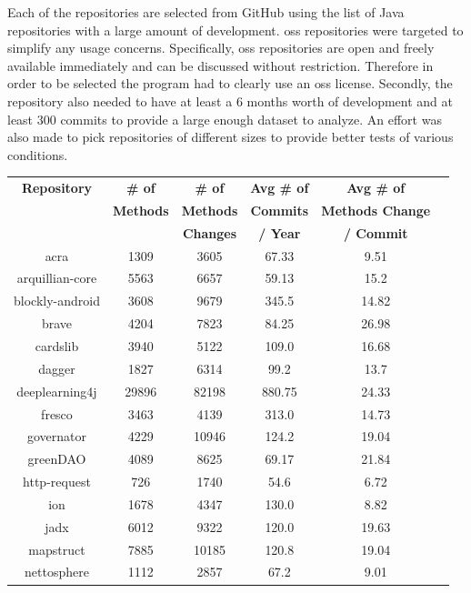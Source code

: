 Each of the repositories are selected from GitHub using the list of Java repositories with a large amount of development. \gls{oss} repositories were targeted to simplify any usage concerns. Specifically, \gls{oss} repositories are open and freely available immediately and can be discussed without restriction. Therefore in order to be selected the program had to clearly use an \gls{oss} license. Secondly, the repository also needed to have at least a 6 months worth of development and at least 300 commits to provide a large enough dataset to analyze. An effort was also made to pick repositories of different sizes to provide better tests of various conditions.

\begin{table}
\begin{center}
    \begin{tabular}{|c|c|c|c|c|c|}
        \hline
        \textbf{Repository} & \textbf{\# of} & \textbf{\# of} & \textbf{Avg \# of} & \textbf{Avg \# of} \\
         & \textbf{Methods} & \textbf{Methods} & \textbf{Commits} & \textbf{Methods Change} \\
         & & \textbf{Changes} & \textbf{/ Year} & \textbf{/ Commit} \\
        \hline
        acra & 1309 & 3605 & 67.33 & 9.51 \\
        arquillian-core & 5563 & 6657 & 59.13 & 15.2 \\
        blockly-android & 3608 & 9679 & 345.5 & 14.82 \\
        brave & 4204 & 7823 & 84.25 & 26.98 \\
        cardslib & 3940 & 5122 & 109.0 & 16.68 \\
        dagger & 1827 & 6314 & 99.2 & 13.7 \\
        deeplearning4j & 29896 & 82198 & 880.75 & 24.33 \\
        fresco & 3463 & 4139 & 313.0 & 14.73 \\
        governator & 4229 & 10946 & 124.2 & 19.04 \\
        greenDAO & 4089 & 8625 & 69.17 & 21.84 \\
        http-request & 726 & 1740 & 54.6 & 6.72 \\
        ion & 1678 & 4347 & 130.0 & 8.82 \\
        jadx & 6012 & 9322 & 120.0 & 19.63 \\
        mapstruct & 7885 & 10185 & 120.8 & 19.04 \\
        nettosphere & 1112 & 2857 & 67.2 & 9.01 \\

\end{tabular}
\end{center}
\end{table}
